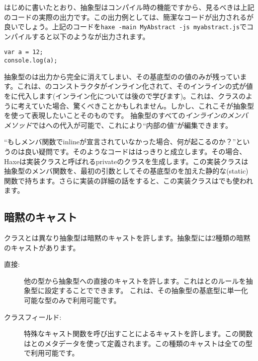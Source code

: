 
はじめに書いたとおり、抽象型はコンパイル時の機能ですから、見るべきは上記のコードの実際の出力です。この出力例としては、簡潔なコードが出力されるが良いでしょう。上記のコードを\texttt{haxe -main MyAbstract -js myabstract.js}でコンパイルすると以下のようなが出力されます。

\begin{lstlisting}
var a = 12;
console.log(a);
\end{lstlisting}

抽象型のは出力から完全に消えてしまい、その基底型のの値のみが残っています。これは、のコンストラクタがインライン化されて、そのインラインの式が値をに代入します(インライン化については後ので学びます)。これは、クラスのように考えていた場合、驚くべきことかもしれません。しかし、これこそが抽象型を使って表現したいことそのものです。
抽象型のすべての\emph{インラインのメンバメソッド}ではへの代入が可能で、これにより``内部の値''が編集できます。

``もしメンバ関数でinlineが宣言されていなかった場合、何が起こるのか？''というのは良い疑問です。そのようなコードははっきりと成立します。その場合、Haxeは実装クラスと呼ばれるprivateのクラスを生成します。この実装クラスは抽象型のメンバ関数を、最初の引数としてその基底型のを加えた静的な(static)関数で持ちます。さらに実装の詳細の話をすると、この実装クラスはでも使われます。




\subsection{暗黙のキャスト}
\label{types-abstract-implicit-casts}

クラスとは異なり抽象型は暗黙のキャストを許します。抽象型には2種類の暗黙のキャストがあります。

\begin{description}
	\item[直接:] 他の型から抽象型への直接のキャストを許します。これはとのルールを抽象型に設定することでできます。 これは、その抽象型の基底型に単一化可能な型のみで利用可能です。
	\item[クラスフィールド:] 特殊なキャスト関数を呼び出すことによるキャストを許します。この関数はとのメタデータを使って定義されます。この種類のキャストは全ての型で利用可能です。
\end{description}

